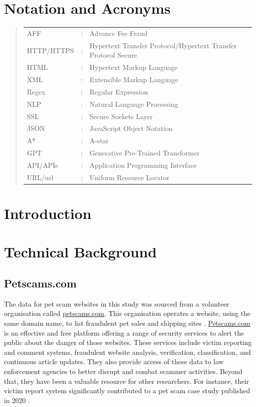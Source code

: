 \documentclass[ oneside,%
                    author={Cassie Qing Tang},
                    degree={BSc},
                     title={The Report for 3D Modelling of Queens Library \\ },
                    subtitle={ }]{dissertation}
\begin{document}
\chapter*{Notation and Acronyms}
\begin{quote}
\noindent
\begin{tabular}{lcl}
AFF                 &:     & Advance Fee Fraud    
 \\ 
HTTP/HTTPS          &:     & Hypertext Transfer Protocol/Hypertext Transfer Protocol Secure
 \\ 
HTML                &:     & Hypertext Markup Language
\\
XML                 &:     & Extensible Markup Language
\\
Regex               &:     & Regular Expression
\\
NLP                 &:     & Natural Language Processing
\\
SSL                 &:     & Secure Sockets Layer
\\
JSON                &:     & JavaScript Object Notation
\\
A*                  &:     & A-star
\\
GPT                 &:     & Generative Pre-Trained Transformer
\\
API/APIs            &:     & Application Programming Interface
\\
URL/url             &:     & Uniform Resource Locator


\end{tabular}
\end{quote}


\mainmatter

\chapter{Introduction}
\label{chap:context}


\chapter{Technical Background}
\section{Petscams.com}
The data for pet scam websites in this study was sourced from a volunteer organisation called \url{petscams.com}. This organisation operates a website, using the same domain name, to list fraudulent pet sales and shipping sites \cite{brady_fighting_2024}. \url{Petscams.com} is an effective and free platform offering a range of security services to alert the public about the danger of those websites. These services include victim reporting and comment systems, fraudulent website analysis, verification, classification, and continuous article updates. They also provide access of these data to law enforcement agencies to better disrupt and combat scammer activities. Beyond that, they have been a valuable resource for other researchers. For instance, their victim report system significantly contributed to a pet scam case study published in 2020 \cite{whittaker_understanding_2020}.
\\
\end{document}
